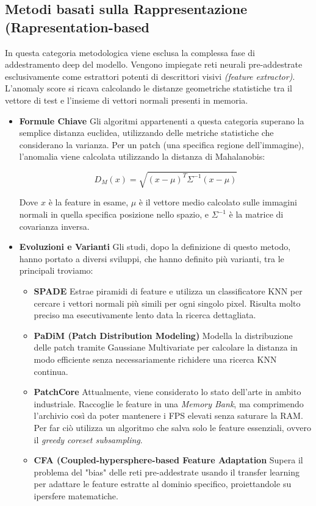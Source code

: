 \subsection{Metodi basati sulla Rappresentazione (Rapresentation-based}

In questa categoria metodologica viene esclusa la complessa fase di addestramento deep del modello. Vengono impiegate reti neurali pre-addestrate esclusivamente come estrattori potenti di descrittori visivi \textit{(feature extractor)}. L'anomaly score si ricava calcolando le distanze geometriche statistiche tra il vettore di test e l'insieme di vettori normali presenti in memoria.\cite{Cui_et_al._2023}

\begin{itemize}
    \item\textbf{Formule Chiave}
    Gli algoritmi appartenenti a questa categoria superano la semplice distanza euclidea, utilizzando delle metriche statistiche che considerano la varianza. Per un patch (una specifica regione dell'immagine), l'anomalia viene calcolata utilizzando la distanza di Mahalanobis:

    \[
    D_M(x) = \sqrt{(x - \mu)^T \Sigma^{-1} (x - \mu)}
    \]

  Dove $x$ è la feature in esame, $\mu$ è il vettore medio calcolato sulle immagini normali in quella specifica posizione nello spazio, e $\Sigma^{-1}$ è la matrice di covarianza inversa.

    \item \textbf{Evoluzioni e Varianti}
    Gli studi, dopo la definizione di questo metodo, hanno portato a diversi sviluppi, che hanno definito più varianti, tra le principali troviamo:
    \begin{itemize}
        \item\textbf{SPADE}
        Estrae piramidi di feature e utilizza un classificatore KNN per cercare i vettori normali più simili per ogni singolo pixel. Risulta molto preciso ma esecutivamente lento data la ricerca dettagliata.\cite{Yang_et_al._2021}

        \item\textbf{PaDiM (Patch Distribution Modeling)}
        Modella la distribuzione delle patch tramite Gaussiane Multivariate per calcolare la distanza in modo efficiente senza necessariamente richidere una ricerca KNN continua.\cite{Cui_et_al._2023}

        \item \textbf{PatchCore}
        Attualmente, viene considerato lo stato dell'arte  in ambito industriale. Raccoglie le feature in una \textit{Memory Bank}, ma comprimendo l'archivio così da poter mantenere i FPS elevati senza saturare la RAM. Per far ciò utilizza un algoritmo che salva solo le feature essenziali, ovvero il \textit{greedy coreset subsampling}.

        \item \textbf{CFA (Coupled-hypersphere-based Feature Adaptation}
        Supera il problema del "bias" delle reti pre-addestrate usando il transfer learning per adattare le feature estratte al dominio specifico, proiettandole su ipersfere matematiche.
    \end{itemize}
\end{itemize}

